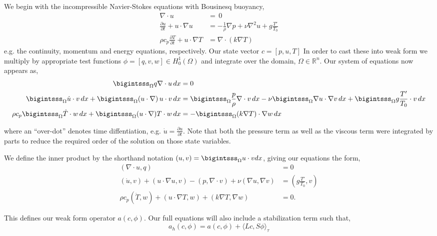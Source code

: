 \documentclass{article}
\begin{document}
We begin with the incompressible Navier-Stokes equations with Bousinesq
buoyancy,
\begin{align}
 \nabla \cdot u &= \, 0 \label{eq_cont}\\
 \frac{\partial u}{\partial t} + u \cdot \nabla u &= -\frac{1}{\rho}
 \nabla p + \nu \nabla^2 u + g \frac{T'}{T_0} \label{eq_mom}\\
 \rho c_p \frac{\partial T}{\partial t} + u \cdot \nabla T &= \nabla
 \cdot (k \nabla T) \label{eq_energy}
\end{align}
e.g. the continuity, momentum and energy equations, respectively. Our 
state vector $c =  \left[p,u,T \right]$ In order to cast these into weak
form we multiply by appropriate test 
functions $\phi = \left[q,v,w \right] \in H^1_0(\Omega)$ and integrate over
the domain, $\Omega \in \mathbb{R}^n$. Our system of equations now
appears as, 
\begin{align}
  \bigintsss_\Omega q \nabla \cdot u \, dx &= 0 \\
 \bigintsss_\Omega \dot u \cdot v \, dx +
 \bigintsss_\Omega  (u \cdot \nabla) \, u \cdot v \, dx &=
 \bigintsss_\Omega \frac{p}{\rho} \nabla \cdot v \, dx - \nu \bigintsss_\Omega \nabla u \cdot \nabla v
 \,dx + \bigintsss_\Omega g \frac{T'}{T_0} \cdot v \, dx \\ 
 \rho c_p \bigintsss_\Omega \dot T \cdot w \, dx + \bigintsss_\Omega (u
 \cdot \nabla) T \cdot w \, dx  &= -\bigintsss_\Omega (k \nabla T) \cdot
 \nabla w \, dx
\end{align}

where an ``over-dot'' denotes time diffentiation, e.g. $\dot u =
\frac{\partial u}{\partial t}$. Note that both the pressure term as well
as the viscous term were integrated by parts to reduce the required
order of the solution on those state variables.  

We define the inner product by the shorthand notation $(u,v) =
\bigintsss_\Omega u\cdot v dx $, giving our equations the form,  
\begin{align}
 (\nabla \cdot u, q) &= 0 \\
 (\dot u,v) + (u \cdot \nabla u, v) - (p,\nabla \cdot v) + \nu (\nabla
 u, \nabla v) &= (g \frac{T'}{T_0},v) \\
 \rho c_p (\dot T,w) + (u \cdot \nabla T,w) + (k \nabla T,\nabla w) &= 0.
\end{align}

This defines our weak form operator $a(c,\phi)$. Our full equations will
also include a stabilization term such that,  
\begin{equation}
 a_h(c,\phi) = a(c,\phi) +  \langle Lc,S\phi \rangle_\tau
\end{equation}
\end{document}
